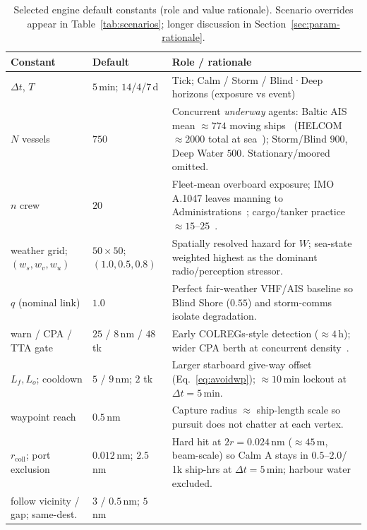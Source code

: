 \documentclass[cameraready]{Interspeech}
\begin{document}
\begin{table}[t]
    \caption{Selected engine default constants (role and value rationale). Scenario overrides appear in Table~\ref{tab:scenarios}; longer discussion in Section~\ref{sec:param-rationale}.}
    \label{tab:constants}
    \centering
    \footnotesize
    \setlength{\tabcolsep}{3.5pt}
    \begin{tabular}{@{}llp{}@{}}
        \toprule
        Constant & Default & Role / rationale \\
        \midrule
        $\Delta t$, $T$ & $5$\,min; $14$/$4$/$7$\,d &
        Tick; Calm / Storm / Blind·Deep horizons (exposure vs event) \\
        $N$ vessels & $750$ &
        Concurrent \emph{underway} agents: Baltic AIS mean ${\approx}774$ moving ships~\cite{huetten2025baltic} (HELCOM ${\approx}2000$ total at sea~\cite{helcom2010}); Storm/Blind $900$, Deep Water $500$. Stationary/moored omitted. \\
        $n$ crew & $20$ &
        Fleet-mean overboard exposure; IMO A.1047 leaves manning to Administrations~\cite{imo1047}; cargo/tanker practice ${\approx}15$--$25$~\cite{helcom2010}. \\
        weather grid; $(w_s,w_v,w_u)$ & $50\times50$; $(1.0,0.5,0.8)$ &
        Spatially resolved hazard for $W$; sea-state weighted highest as the dominant radio/perception stressor. \\
        $q$ (nominal link) & $1.0$ &
        Perfect fair-weather VHF/AIS baseline so Blind Shore ($0.55$) and storm-comms isolate degradation. \\
        warn / CPA / TTA gate & $25$ / $8$\,nm / $48$ tk &
        Early COLREGs-style detection (${\approx}4$\,h); wider CPA berth at concurrent density~\cite{colregs1972,tam2010}. \\
        $L_f,L_o$; cooldown & $5$ / $9$\,nm; $2$ tk &
        Larger starboard give-way offset (Eq.~\ref{eq:avoidwp}); ${\approx}10$\,min lockout at $\Delta t=5$\,min. \\
        waypoint reach & $0.5$\,nm &
        Capture radius ${\approx}$ ship-length scale so pursuit does not chatter at each vertex. \\
        $r_{\text{coll}}$; port exclusion & $0.012$\,nm; $2.5$\,nm &
        Hard hit at $2r{=}0.024$\,nm (${\approx}45$\,m, beam-scale) so Calm A stays in $0.5$--$2.0$/\,1k ship-hrs at $\Delta t=5$\,min; harbour water excluded. \\
        follow vicinity / gap; same-dest. & $3$ / $0.5$\,nm; $5$\,nm &

\end{tabular}
\end{table}
\end{document}

